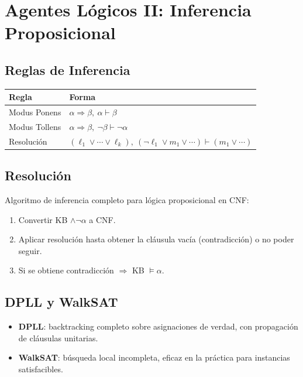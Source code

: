 \section{Agentes Lógicos II: Inferencia Proposicional}

\subsection{Reglas de Inferencia}

\begin{tabular}{ll}
\toprule
\textbf{Regla} & \textbf{Forma} \\
\midrule
Modus Ponens & $\alpha \Rightarrow \beta,\ \alpha \vdash \beta$ \\
Modus Tollens & $\alpha \Rightarrow \beta,\ \neg\beta \vdash \neg\alpha$ \\
Resolución & $(\ell_1 \lor \cdots \lor \ell_k),\ (\neg\ell_1 \lor m_1 \lor \cdots) \vdash (m_1 \lor \cdots)$ \\
\bottomrule
\end{tabular}

\subsection{Resolución}

Algoritmo de inferencia completo para lógica proposicional en CNF:
\begin{enumerate}
    \item Convertir KB $\land \neg\alpha$ a CNF.
    \item Aplicar resolución hasta obtener la cláusula vacía (contradicción) o no poder seguir.
    \item Si se obtiene contradicción $\Rightarrow$ KB $\models \alpha$.
\end{enumerate}

\subsection{DPLL y WalkSAT}

\begin{itemize}
    \item \textbf{DPLL}: backtracking completo sobre asignaciones de verdad, con propagación de cláusulas unitarias.
    \item \textbf{WalkSAT}: búsqueda local incompleta, eficaz en la práctica para instancias satisfacibles.
\end{itemize}

